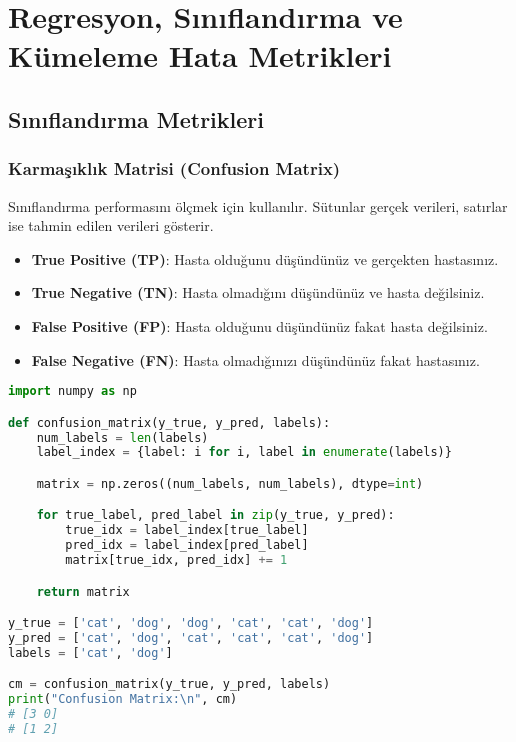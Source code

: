\section{Regresyon, Sınıflandırma ve Kümeleme Hata Metrikleri}

\subsection{Sınıflandırma Metrikleri}

\subsubsection{Karmaşıklık Matrisi (Confusion Matrix)}

Sınıflandırma performasını ölçmek için kullanılır. Sütunlar gerçek verileri, satırlar ise tahmin edilen verileri gösterir. 

\begin{itemize}
    \item \textbf{True Positive (TP)}: Hasta olduğunu düşündünüz ve gerçekten hastasınız. 
    \item \textbf{True Negative (TN)}: Hasta olmadığını düşündünüz ve hasta değilsiniz. 
    \item \textbf{False Positive (FP)}: Hasta olduğunu düşündünüz fakat hasta değilsiniz. 
    \item \textbf{False Negative (FN)}: Hasta olmadığınızı düşündünüz fakat hastasınız.
\end{itemize}

\begin{lstlisting}[language=Python]
import numpy as np

def confusion_matrix(y_true, y_pred, labels):
    num_labels = len(labels)
    label_index = {label: i for i, label in enumerate(labels)}

    matrix = np.zeros((num_labels, num_labels), dtype=int)

    for true_label, pred_label in zip(y_true, y_pred):
        true_idx = label_index[true_label]
        pred_idx = label_index[pred_label]
        matrix[true_idx, pred_idx] += 1

    return matrix

y_true = ['cat', 'dog', 'dog', 'cat', 'cat', 'dog']
y_pred = ['cat', 'dog', 'cat', 'cat', 'cat', 'dog']
labels = ['cat', 'dog']

cm = confusion_matrix(y_true, y_pred, labels)
print("Confusion Matrix:\n", cm)
# [3 0]
# [1 2]
\end{lstlisting}

